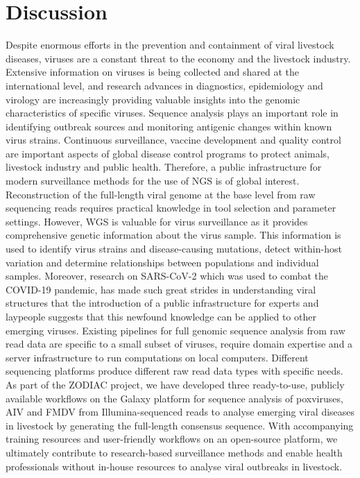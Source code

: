 \chapter{Discussion}\label{chap:discussion}
Despite enormous efforts in the prevention and containment of viral livestock diseases, viruses are a constant threat to the economy and the livestock industry. Extensive information on viruses is being collected and shared at the international level, and research advances in diagnostics, epidemiology and virology are increasingly providing valuable insights into the genomic characteristics of specific viruses. Sequence analysis plays an important role in identifying outbreak sources and monitoring antigenic changes within known virus strains. Continuous surveillance, vaccine development and quality control are important aspects of global disease control programs to protect animals, livestock industry and public health. Therefore, a public infrastructure for modern surveillance methods for the use of \ac{NGS} is of global interest. Reconstruction of the full-length viral genome at the base level from raw sequencing reads requires practical knowledge in tool selection and parameter settings. However, \ac{WGS} is valuable for virus surveillance as it provides comprehensive genetic information about the virus sample. This information is used to identify virus strains and disease-causing mutations, detect within-host variation and determine relationships between populations and individual samples. Moreover, research on \ac{SARS-CoV-2} which was used to combat the \ac{COVID-19} pandemic, has made such great strides in understanding viral structures that the introduction of a public infrastructure for experts and laypeople suggests that this newfound knowledge can be applied to other emerging viruses. Existing pipelines for full genomic sequence analysis from raw read data are specific to a small subset of viruses, require domain expertise and a server infrastructure to run computations on local computers. Different sequencing platforms produce different raw read data types with specific needs. As part of the \ac{ZODIAC} project, we have developed three ready-to-use, publicly available workflows on the Galaxy platform for sequence analysis of poxviruses, \ac{AIV} and \ac{FMDV} from Illumina-sequenced reads to analyse emerging viral diseases in livestock by generating the full-length consensus sequence. With accompanying training resources and user-friendly workflows on an open-source platform, we ultimately contribute to research-based surveillance methods and enable health professionals without in-house resources to analyse viral outbreaks in livestock.

